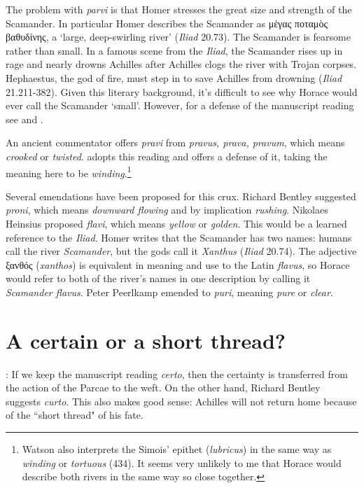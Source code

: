 The problem with \textit{parvi} is that Homer stresses the great size and strength of the Scamander.  In particular Homer describes the Scamander as μέγας ποταμὸς βαθυδίνης, a `large, deep-swirling river' (\textit{Iliad} 20.73).  The Scamander is fearsome rather than small.  In a famous scene from the \textit{Iliad}, the Scamander rises up in rage and nearly drowns Achilles after Achilles clogs the river with Trojan corpses.  Hephaestus, the god of fire, must step in to save Achilles from drowning (\textit{Iliad} 21.211-382).  Given this literary background, it's difficult to see why Horace would ever call the Scamander `small'.  However, for a defense of the manuscript reading see \citet[223--224]{mankin1995} and \citet[207--209]{gaskin2013}.

An ancient commentator offers \textit{pravi} from \textit{pravus, prava, pravum}, which means \textit{crooked} or \textit{twisted}.  \citet[433--434]{watson2003} adopts this reading and offers a defense of it, taking the meaning here to be \textit{winding}.\footnote{Watson also interprets the Simois' epithet (\textit{lubricus}) in the same way as \textit{winding}  or \textit{tortuous} (434).  It seems very unlikely to me that Horace would describe both rivers in the same way so close together.}

Several emendations have been proposed for this crux. Richard Bentley suggested \textit{proni}, which means \textit{downward flowing} and by implication \textit{rushing}. Nikolaes Heinsius proposed \textit{flavi}, which means \textit{yellow} or \textit{golden}. This would be a learned reference to the \textit{Iliad}. Homer writes that the Scamander has two names: humans call the river \textit{Scamander}, but the gods call it \textit{Xanthus} (\textit{Iliad} 20.74). The adjective ξανθός (\textit{xanthos}) is equivalent in meaning and use to the Latin \textit{flavus}, so  Horace would refer to both of the river's names in one description by calling it \textit{Scamander flavus}. Peter Peerlkamp emended to \textit{puri}, meaning \textit{pure} or \textit{clear}.


\section*{A certain or a short thread?}


: If we keep the manuscript reading \textit{certo}, then the certainty is transferred from the action of the Parcae to the weft.  On the other hand, Richard Bentley suggests \textit{curto}.  This also makes good sense: Achilles will not return home because of the ``short thread" of his fate.

